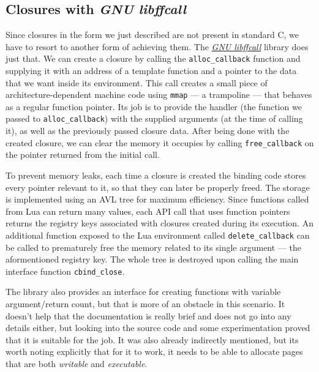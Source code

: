 \documentclass[polish, english]{iithesis}
\begin{document}
    \subsection{Closures with \textit{GNU libffcall}}
      Since closures in the form we just described are not present in standard C, we have to resort to another form of achieving them.
      The \href{https://www.gnu.org/software/libffcall/}{\textit{GNU libffcall}} library does just that.
      We can create a closure by calling the \texttt{alloc\_callback} function and supplying it with an address of a template function and a pointer to the data that we want inside its environment.
      This call creates a small piece of architecture-dependent machine code using \texttt{mmap} --- a trampoline --- that behaves as a regular function pointer.
      Its job is to provide the handler (the function we passed to \texttt{alloc\_callback}) with the supplied arguments (at the time of calling it), as well as the previously passed closure data.
      After being done with the created closure, we can clear the memory it occupies by calling \texttt{free\_callback} on the pointer returned from the initial call.

      To prevent memory leaks, each time a closure is created the binding code stores every pointer relevant to it, so that they can later be properly freed.
      The storage is implemented using an AVL tree for maximum efficiency.
      Since functions called from Lua can return many values, each API call that uses function pointers returns the registry keys associated with closures created during its execution.
      An additional function exposed to the Lua environment called \texttt{delete\_callback} can be called to prematurely free the memory related to its single argument --- the aformentioned registry key.
      The whole tree is destroyed upon calling the main interface function \texttt{cbind\_close}.

      The library also provides an interface for creating functions with variable argument/return count, but that is more of an obstacle in this scenario.
      It doesn't help that the documentation is really brief and does not go into any details either, but looking into the source code and some experimentation proved that it is suitable for the job.
      It was also already indirectly mentioned, but its worth noting explicitly that for it to work, it needs to be able to allocate pages that are both \textit{writable} and \textit{executable}.
\end{document}
